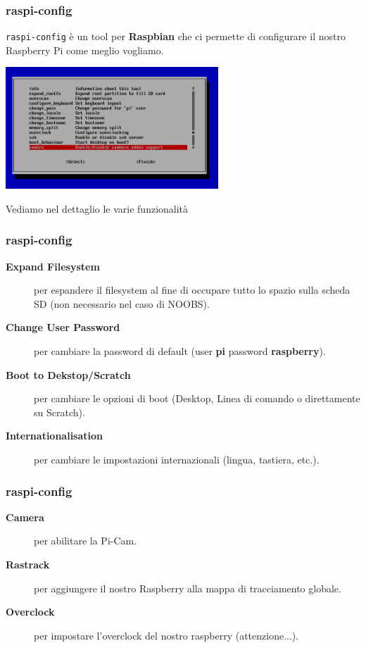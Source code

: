 \documentclass[xcolor=svgnames,11pt]{beamer}
\begin{document}
\begin{frame}\frametitle{raspi-config}
\texttt{raspi-config} \`e un tool per \textbf{Raspbian} che ci permette di configurare il nostro Raspberry Pi come meglio vogliamo.
\medskip
\begin{center}
\includegraphics[width=8cm]{raspi-config.png}
\end{center}
\medskip
Vediamo nel dettaglio le varie funzionalit\`a
\end{frame}

\begin{frame}\frametitle{raspi-config}
\begin{description}
  \item[\textbf{Expand Filesystem}] per espandere il filesystem al fine di occupare tutto lo spazio sulla scheda SD (non necessario nel caso di NOOBS).
  \item[\textbf{Change User Password}] per cambiare la password di default (user \textbf{pi} password \textbf{raspberry}).
  \item[\textbf{Boot to Dekstop/Scratch}] per cambiare le opzioni di boot (Desktop, Linea di comando o direttamente su Scratch).
  \item[\textbf{Internationalisation}] per cambiare le impostazioni internazionali (lingua, tastiera, etc.).
\end{description}
\end{frame}

\begin{frame}\frametitle{raspi-config}
\begin{description}
  \item[\textbf{Camera}] per abilitare la Pi-Cam.
  \item[\textbf{Rastrack}] per aggiungere il nostro Raspberry alla mappa di tracciamento globale.
  \item[\textbf{Overclock}] per impostare l'overclock del nostro raspberry (attenzione...).
\end{description}
\end{frame}
\end{document}

